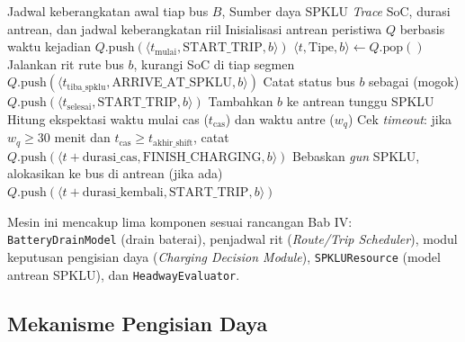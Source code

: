 \begin{algorithm}[h!]
\caption{Loop Utama Mesin Simulasi Berbasis Peristiwa Diskrit}
\label{alg:des-loop}
\begin{algorithmic}[1]
\Require Jadwal keberangkatan awal tiap bus $B$, Sumber daya SPKLU
\Ensure \textit{Trace} SoC, durasi antrean, dan jadwal keberangkatan riil
\State Inisialisasi antrean peristiwa $Q$ berbasis waktu kejadian
    \State $Q.\text{push}(\langle t_{\text{mulai}}, \text{START\_TRIP}, b \rangle)$
\EndFor
{}
    \State $\langle t, \text{Tipe}, b \rangle \gets Q.\text{pop}()$
        \State Jalankan rit rute bus $b$, kurangi SoC di tiap segmen
            \State $Q.\text{push}(\langle t_{\text{tiba\_spklu}}, \text{ARRIVE\_AT\_SPKLU}, b \rangle)$
            \State Catat status bus $b$ sebagai  (mogok)
        \Else
            \State $Q.\text{push}(\langle t_{\text{selesai}}, \text{START\_TRIP}, b \rangle)$
        \EndIf
            \State Tambahkan $b$ ke antrean tunggu SPKLU
            \State Hitung ekspektasi waktu mulai cas ($t_{\text{cas}}$) dan waktu antre ($w_q$)
            \State Cek \textit{timeout}: jika $w_q \geq 30$ menit dan $t_{\text{cas}} \geq t_{\text{akhir\_shift}}$, catat 
        \Else
            \State $Q.\text{push}(\langle t + \text{durasi\_cas}, \text{FINISH\_CHARGING}, b \rangle)$
        \EndIf
        \State Bebaskan \textit{gun} SPKLU, alokasikan ke bus di antrean (jika ada)
        \State $Q.\text{push}(\langle t + \text{durasi\_kembali}, \text{START\_TRIP}, b \rangle)$
    \EndIf
\EndWhile
\end{algorithmic}
\end{algorithm}

Mesin ini mencakup lima komponen sesuai rancangan Bab IV: \texttt{BatteryDrainModel}
(drain baterai), penjadwal rit (\textit{Route/Trip Scheduler}), modul
keputusan pengisian daya (\textit{Charging Decision Module}),
\texttt{SPKLUResource} (model antrean SPKLU), dan \texttt{HeadwayEvaluator}.

\subsection{Mekanisme Pengisian Daya}

